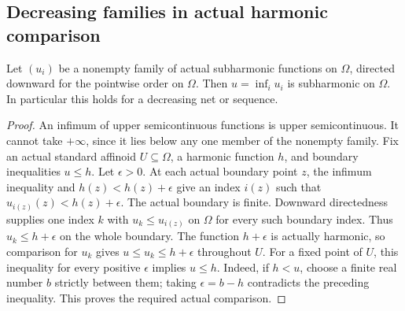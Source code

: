 \subsection{Decreasing families in actual harmonic comparison}\label{subsec:fc-line-subharmonic-limits}

\begin{theorem}\label{thm:fc-line-subharmonic-directed-inf}
\leanok
{}
Let $(u_i)$ be a nonempty family of actual subharmonic functions on $\Omega$,
directed downward for the pointwise order on $\Omega$. Then
$u=\inf_i u_i$ is subharmonic on $\Omega$. In particular this holds for a
decreasing net or sequence.
\end{theorem}

\begin{proof}
An infimum of upper semicontinuous functions is upper semicontinuous. It
cannot take $+\infty$, since it lies below any one member of the nonempty
family. Fix an actual standard affinoid $U\subseteq\Omega$, a harmonic
function $h$, and boundary inequalities $u\le h$. Let $\epsilon>0$.
At each actual boundary point $z$, the infimum inequality and
$h(z)<h(z)+\epsilon$ give an index $i(z)$ such that
$u_{i(z)}(z)<h(z)+\epsilon$. The actual boundary is finite. Downward
directedness supplies one index $k$ with $u_k\le u_{i(z)}$ on $\Omega$
for every such boundary index. Thus $u_k\le h+\epsilon$ on the whole
boundary. The function $h+\epsilon$ is actually harmonic, so comparison
for $u_k$ gives $u\le u_k\le h+\epsilon$ throughout $U$.
For a fixed point of $U$, this inequality for every positive $\epsilon$
implies $u\le h$. Indeed, if $h<u$, choose a finite real number $b$
strictly between them; taking $\epsilon=b-h$ contradicts the preceding
inequality. This proves the required actual comparison.
\end{proof}
